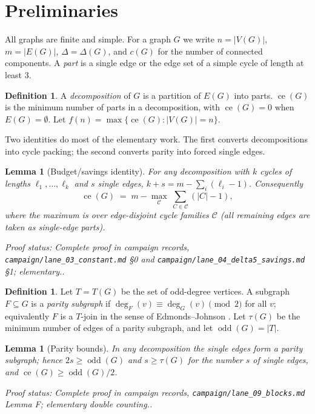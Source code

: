 \documentclass[a4paper,11pt]{amsart}
\newtheorem{lemma}[theorem]{Lemma}
\theoremstyle{definition}
\newtheorem{definition}[theorem]{Definition}
\theoremstyle{remark}
\newcommand{\ce}{\operatorname{ce}}
\newcommand{\odd}{\operatorname{odd}}
\newcommand{\proofsrc}[1]{\par\smallskip\noindent\begin{sloppypar}\small\emph{Proof status: #1.}\end{sloppypar}\par\smallskip}
\begin{document}
\section{Preliminaries}\label{sec:prelim}

All graphs are finite and simple. For a graph $G$ we write $n=|V(G)|$, $m=|E(G)|$, $\Delta=\Delta(G)$, and
$c(G)$ for the number of connected components. A \emph{part} is a single edge or the edge set of a simple
cycle of length at least $3$.

\begin{definition}\label{def:ce}
A \emph{decomposition} of $G$ is a partition of $E(G)$ into parts. $\ce(G)$ is the minimum number of parts
in a decomposition, with $\ce(G)=0$ when $E(G)=\emptyset$. Let $f(n)=\max\{\ce(G):|V(G)|=n\}$.
\end{definition}

Two identities do most of the elementary work. The first converts decompositions into cycle packing; the
second converts parity into forced single edges.

\begin{lemma}[Budget/savings identity]\label{lem:savings}
For any decomposition with $k$ cycles of lengths $\ell_1,\dots,\ell_k$ and $s$ single edges,
$k+s=m-\sum_i(\ell_i-1)$. Consequently
\[
\ce(G)\;=\;m-\max_{\mathcal{C}}\ \textstyle\sum_{C\in\mathcal{C}}(|C|-1),
\]
where the maximum is over edge-disjoint cycle families $\mathcal{C}$ (all remaining edges are taken as
single-edge parts).
\end{lemma}
\proofsrc{Complete proof in campaign records, \texttt{campaign/lane\_03\_constant.md} \S0 and
\texttt{campaign/lane\_04\_delta5\_savings.md} \S1; elementary.}

\begin{definition}\label{def:parity}
Let $T=T(G)$ be the set of odd-degree vertices. A subgraph $F\subseteq G$ is a \emph{parity subgraph} if
$\deg_F(v)\equiv\deg_G(v)\pmod 2$ for all $v$; equivalently $F$ is a $T$-join in the sense of
Edmonds--Johnson \cite{EJ73}. Let $\tau(G)$ be the minimum number of edges of a parity subgraph, and let
$\odd(G)=|T|$.
\end{definition}

\begin{lemma}[Parity bounds]\label{lem:parity}
In any decomposition the single edges form a parity subgraph; hence $2s\ge\odd(G)$ and $s\ge\tau(G)$ for
the number $s$ of single edges, and $\ce(G)\ge\odd(G)/2$.
\end{lemma}
\proofsrc{Complete proof in campaign records, \texttt{campaign/lane\_09\_blocks.md} Lemma F; elementary
double counting.}
\end{document}
